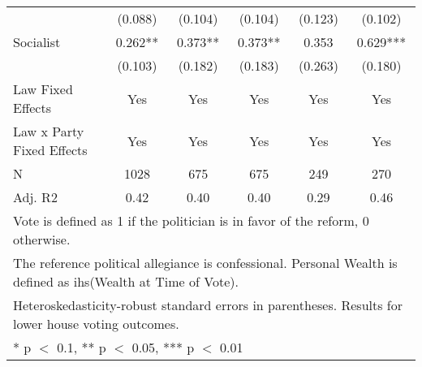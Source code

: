 \begin{table}[!h]
{\begin{tabular}[t]{lccccc}
 & (\num{0.088}) & (\num{0.104}) & (\num{0.104}) & (\num{0.123}) & (\num{0.102})\\
Socialist & \num{0.262}** & \num{0.373}** & \num{0.373}** & \num{0.353} & \num{0.629}***\\
 & (\num{0.103}) & (\num{0.182}) & (\num{0.183}) & (\num{0.263}) & (\num{0.180})\\
\midrule
Law Fixed Effects & Yes & Yes & Yes & Yes & Yes\\
Law x Party Fixed Effects & Yes & Yes & Yes & Yes & Yes\\
N & \num{1028} & \num{675} & \num{675} & \num{249} & \num{270}\\
Adj. R2 & \num{0.42} & \num{0.40} & \num{0.40} & \num{0.29} & \num{0.46}\\
\bottomrule
\multicolumn{6}{l}{\rule{0pt}{1em}Vote is defined as 1 if the politician is in favor of the reform, 0 otherwise.}\\
\multicolumn{6}{l}{\rule{0pt}{1em}The reference political allegiance is confessional. Personal Wealth is defined as ihs(Wealth at Time of Vote).}\\
\multicolumn{6}{l}{\rule{0pt}{1em}Heteroskedasticity-robust standard errors in parentheses. Results for lower house voting outcomes.}\\
\multicolumn{6}{l}{\rule{0pt}{1em}* p $<$ 0.1, ** p $<$ 0.05, *** p $<$ 0.01}\\
\end{tabular}}
\end{table}

